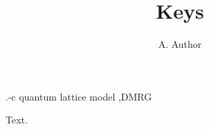 \documentclass{elsart5}
\begin{document}
\begin{frontmatter}
\title{Keys}
\author{A. Author}
\begin{keyword}
.-c
\KEY quantum lattice model \sep DMRG
\end{keyword}
\end{frontmatter}
Text.
\end{document}
